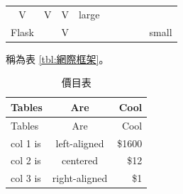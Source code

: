 \documentclass[12pt,,]{report}
\begin{document}
\begin{longtable}[]{@{}ccccccccc@{}}
\begin{minipage}[t]{0.13\columnwidth}
V\strut
\end{minipage} & \begin{minipage}[t]{0.11\columnwidth}\centering
V\strut
\end{minipage} & \begin{minipage}[t]{0.12\columnwidth}\centering
V\strut
\end{minipage} & \begin{minipage}[t]{0.11\columnwidth}\centering
large\strut
\end{minipage}\tabularnewline
\begin{minipage}[t]{0.09\columnwidth}\centering
Flask\strut
\end{minipage} & \begin{minipage}[t]{0.07\columnwidth}\centering
2010\strut
\end{minipage} & \begin{minipage}[t]{0.04\columnwidth}\centering
V\strut
\end{minipage} & \begin{minipage}[t]{0.04\columnwidth}\centering
\strut
\end{minipage} & \begin{minipage}[t]{0.04\columnwidth}\centering
\strut
\end{minipage} & \begin{minipage}[t]{0.13\columnwidth}\centering
\strut
\end{minipage} & \begin{minipage}[t]{0.11\columnwidth}\centering
\strut
\end{minipage} & \begin{minipage}[t]{0.12\columnwidth}\centering
\strut
\end{minipage} & \begin{minipage}[t]{0.11\columnwidth}\centering
small\strut
\end{minipage}\tabularnewline
\bottomrule
\end{longtable}

稱為表 \ref{tbl:網際框架}。

\begin{longtable}[]{@{}lcr@{}}
\caption{價目表 \label{tbl:價目表}}\tabularnewline
\toprule
Tables & Are & Cool\tabularnewline
\midrule
\endfirsthead
\toprule
Tables & Are & Cool\tabularnewline
\midrule
\endhead
col 1 is & left-aligned & \$1600\tabularnewline
col 2 is & centered & \$12\tabularnewline
col 3 is & right-aligned & \$1\tabularnewline
\bottomrule
\end{longtable}
\end{document}
